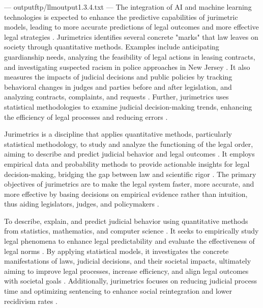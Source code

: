 ---
outputftp/llmoutput1.3.4.txt
---
The integration of AI and machine learning technologies is expected to enhance the predictive capabilities of jurimetric models, leading to more accurate predictions of legal outcomes and more effective legal strategies \cite{10.1007/s11186-021-09453-1,10.5040/9781350220645}. Jurimetrics identifies several concrete "marks" that law leaves on society through quantitative methods. Examples include anticipating guardianship needs, analyzing the feasibility of legal actions in leasing contracts, and investigating suspected racism in police approaches in New Jersey \cite{zabala1809}. It also measures the impacts of judicial decisions and public policies by tracking behavioral changes in judges and parties before and after legislation, and analyzing contracts, complaints, and requests \cite{nunes2018}. Further, jurimetrics uses statistical methodologies to examine judicial decision-making trends, enhancing the efficiency of legal processes and reducing errors \cite{massuanganhe2016, nunes2018}.

Jurimetrics is a discipline that applies quantitative methods, particularly statistical methodology, to study and analyze the functioning of the legal order, aiming to describe and predict judicial behavior and legal outcomes \cite{nunes2018, massuanganhe2016, loevinger1949}. It employs empirical data and probability methods to provide actionable insights for legal decision-making, bridging the gap between law and scientific rigor \cite{nunes2018, de2010}. The primary objectives of jurimetrics are to make the legal system faster, more accurate, and more effective by basing decisions on empirical evidence rather than intuition, thus aiding legislators, judges, and policymakers \cite{nunes2018, loevinger1949, zabala1809}.

To describe, explain, and predict judicial behavior using quantitative methods from statistics, mathematics, and computer science \cite{luvizotto2020, nunes2018}. It seeks to empirically study legal phenomena to enhance legal predictability and evaluate the effectiveness of legal norms \cite{nunes2018, de2010}. By applying statistical models, it investigates the concrete manifestations of laws, judicial decisions, and their societal impacts, ultimately aiming to improve legal processes, increase efficiency, and align legal outcomes with societal goals \cite{massuanganhe2016, luvizotto2020}. Additionally, jurimetrics focuses on reducing judicial process time and optimizing sentencing to enhance social reintegration and lower recidivism rates \cite{nunes2018}.


